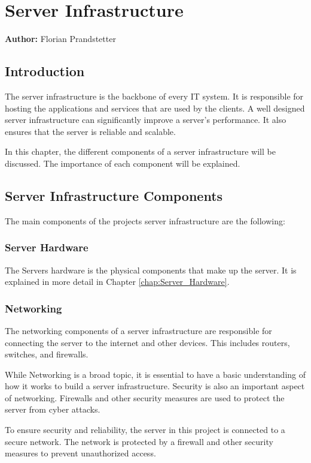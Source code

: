 \chapter{Server Infrastructure}
\label{chap:Server_Infrastructure}
\textbf{Author:} Florian Prandstetter


\section{Introduction}

The server infrastructure is the backbone of every IT system. It is responsible for hosting the applications and services that are used by the clients.
A well designed server infrastructure can significantly improve a server's performance. It also ensures that the server is reliable and scalable.

In this chapter, the different components of a server infrastructure will be discussed. The importance of each component will be explained.

\section{Server Infrastructure Components}

The main components of the projects server infrastructure are the following:

\subsection{Server Hardware}

The Servers hardware is the physical components that make up the server. 
It is explained in more detail in Chapter \ref{chap:Server_Hardware}.

\subsection{Networking}

The networking components of a server infrastructure are responsible for connecting the server to the internet and other devices.
This includes routers, switches, and firewalls.

While Networking is a broad topic, it is essential to have a basic understanding of how it works to build a server infrastructure.
Security is also an important aspect of networking. Firewalls and other security measures are used to protect the server from cyber attacks.   

To ensure security and reliability, the server in this project is connected to a secure network. The network is protected by a firewall and other security measures to prevent unauthorized access.

